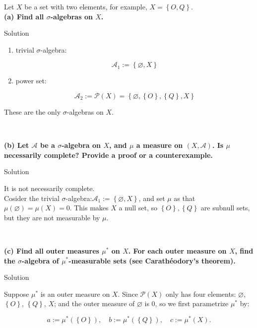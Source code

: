 Let \(X\) be a set with two elements, for example, \(X = \left\{ {O,Q} \right\}\).\\
\textbf{(a) Find all \(\sigma\)-algebras on \(X\).}

\begin{qlsolution}{Solution}

\begin{enumerate}
\item
  trivial \(\sigma\)-algebra:

  \[\mathcal{A}_{1} := \left\{ {\varnothing, X} \right\}\]
\item
  power set:

  \[\mathcal{A}_{2} := \mathcal{P}(X) = \left\{ {\varnothing,\left\{ O \right\},\left\{ Q \right\}, X} \right\}\]
\end{enumerate}

These are the only \(\sigma\)-algebras on \(X\).\\
\strut \\

\end{qlsolution}

\textbf{(b) Let \(\mathcal{A}\) be a \(\sigma\)-algebra on \(X\), and \(\mu\) a measure on \((X,\mathcal{A})\). Is \(\mu\) necessarily complete? Provide a proof or a counterexample.}

\begin{qlsolution}{Solution}

It is not necessarily complete.\\
Cosider the trivial \(\sigma\)-algebra:\(\mathcal{A}_{1} := \left\{ {\varnothing, X} \right\}\), and set \(\mu\) as that \(\mu(\varnothing) = \mu(X) = 0\). This makes \(X\) a null set, so \(\left\{ O \right\},\left\{ Q \right\}\) are subnull sets, but they are not measurable by \(\mu\).\\
\strut \\

\end{qlsolution}

\textbf{(c) Find all outer measures \(\mu^{\ast}\) on \(X\). For each outer measure on \(X\), find the \(\sigma\)-algebra of \(\mu^{\ast}\)-measurable sets (see Carathéodory's theorem).}

\begin{qlsolution}{Solution}

Suppose \(\mu^{\ast}\) is an outer measure on \(X\). Since \(\mathcal{P}(X)\) only has four elements: \(\varnothing\), \(\left\{ O \right\}\), \(\left\{ Q \right\}\), \(X\); and the outer measure of \(\varnothing\) is 0, so we first parametrize \(\mu^{\ast}\) by:

\[a := \mu^{\ast}(\left\{ O \right\}),\quad b := \mu^{\ast}(\left\{ Q \right\}),\quad c := \mu^{\ast}(X).\]

\end{qlsolution}

